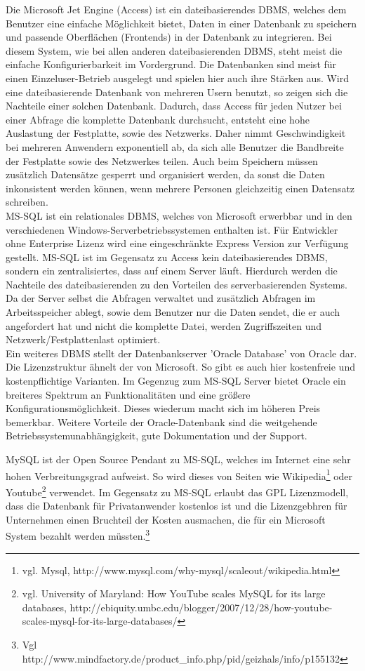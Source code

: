Die Microsoft Jet Engine (Access) ist ein dateibasierendes DBMS, welches dem Benutzer eine einfache Möglichkeit bietet, Daten in einer Datenbank zu speichern und passende Oberflächen (Frontends) in der Datenbank zu integrieren.
Bei diesem System, wie bei allen anderen dateibasierenden DBMS, steht meist die einfache Konfigurierbarkeit im Vordergrund. Die Datenbanken sind meist für einen Einzeluser-Betrieb ausgelegt und spielen hier auch ihre Stärken aus.
Wird eine dateibasierende Datenbank von mehreren Usern benutzt, so zeigen sich die Nachteile einer solchen Datenbank.
Dadurch, dass Access für jeden Nutzer bei einer Abfrage die komplette Datenbank durchsucht, entsteht eine hohe Auslastung der Festplatte, sowie des Netzwerks. Daher nimmt Geschwindigkeit bei mehreren Anwendern exponentiell ab, da sich alle Benutzer die Bandbreite der Festplatte sowie des Netzwerkes teilen.
Auch beim Speichern müssen zusätzlich Datensätze gesperrt und organisiert werden, da sonst die Daten inkonsistent werden können, wenn mehrere Personen gleichzeitig einen Datensatz schreiben.\\
MS-SQL ist ein relationales DBMS, welches von Microsoft erwerbbar
und in den verschiedenen Windows-Serverbetriebssystemen enthalten ist.
Für Entwickler ohne Enterprise Lizenz wird eine eingeschränkte Express Version zur Verfügung gestellt.
MS-SQL ist im Gegensatz zu Access kein dateibasierendes DBMS, sondern ein zentralisiertes, dass auf einem Server läuft.
Hierdurch werden die Nachteile des dateibasierenden zu den Vorteilen des serverbasierenden Systems.
Da der Server selbst die Abfragen verwaltet und zusätzlich Abfragen im Arbeitsspeicher ablegt, sowie dem Benutzer nur die Daten
sendet, die er auch angefordert hat und nicht die komplette Datei, werden Zugriffszeiten
und Netzwerk/Festplattenlast optimiert.\\
Ein weiteres DBMS stellt der Datenbankserver 'Oracle Database' von Oracle dar.
Die Lizenzstruktur ähnelt der von Microsoft.
So gibt es auch hier kostenfreie und kostenpflichtige Varianten.
Im Gegenzug zum MS-SQL Server bietet Oracle ein breiteres Spektrum an Funktionalitäten und eine größere Konfigurationsmöglichkeit.
Dieses wiederum macht sich im höheren Preis bemerkbar.
Weitere Vorteile der Oracle-Datenbank sind die weitgehende Betriebssystemunabhängigkeit, gute Dokumentation und der Support.

MySQL ist der Open Source Pendant zu MS-SQL, welches im Internet eine sehr hohen Verbreitungsgrad aufweist.
So wird dieses von Seiten wie Wikipedia\footnote{vgl. Mysql, http://www.mysql.com/why-mysql/scaleout/wikipedia.html} oder
Youtube\footnote{vgl. University of Maryland: How YouTube scales MySQL for its large databases, http://ebiquity.umbc.edu/blogger/2007/12/28/how-youtube-scales-mysql-for-its-large-databases/} verwendet.
Im Gegensatz zu MS-SQL erlaubt das GPL Lizenzmodell, dass die Datenbank für Privatanwender kostenlos ist und die Lizenzgebhren für Unternehmen einen Bruchteil der Kosten ausmachen, die für ein Microsoft System bezahlt werden müssten.\footnote{Vgl http://www.mindfactory.de/product\_info.php/pid/geizhals/info/p155132}


